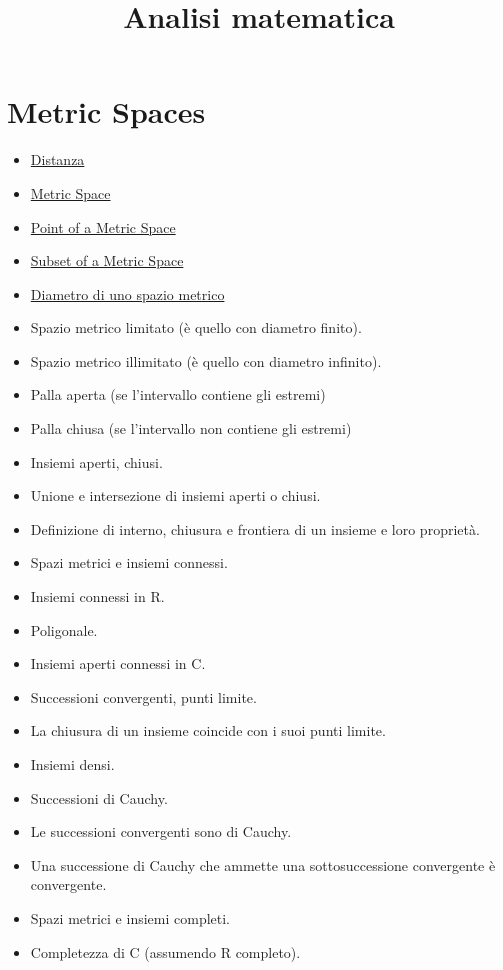 \documentclass[a4paper,10pt]{article}
\title{Analisi matematica}
\author{}
\begin{document}
\maketitle

\section{Metric Spaces}
\begin{itemize}
 \item \href{Distanza.html}{Distanza}
 \item \href{MetricSpace.html}{Metric Space}
 \item \href{PointMetricSpace.html}{Point of a Metric Space}
 \item \href{SubsetMetricSpace.html}{Subset of a Metric Space}
 \item \href{DiametroSpazioMetrico.html}{Diametro di uno spazio metrico} 
 \item Spazio metrico limitato (è quello con diametro finito).
 \item Spazio metrico illimitato (è quello con diametro infinito). 
 \item Palla aperta (se l'intervallo contiene gli estremi)
 \item Palla chiusa (se l'intervallo non contiene gli estremi)
 \item Insiemi aperti, chiusi. 
 \item Unione e intersezione di insiemi aperti o chiusi. 
 \item Definizione di interno, chiusura e frontiera di un insieme e loro proprietà. 
 \item Spazi metrici e insiemi connessi. 
 \item Insiemi connessi in R. 
 \item Poligonale.
 \item Insiemi aperti connessi in C. 
 \item Successioni convergenti, punti limite. 
 \item La chiusura di un insieme coincide con i suoi punti limite. 
 \item Insiemi densi. 
 \item Successioni di Cauchy.
 \item Le successioni convergenti sono di Cauchy. 
 \item Una successione di Cauchy che ammette una sottosuccessione convergente è convergente. 
 \item Spazi metrici e insiemi completi.
 \item Completezza di C (assumendo R completo). 

\end{itemize}
\end{document}
